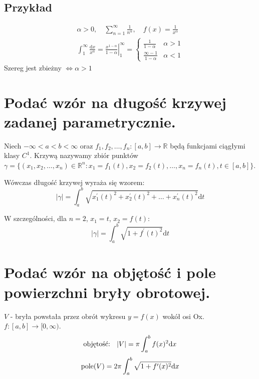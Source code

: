 \documentclass{article}
\theoremstyle{definition}
\theoremstyle{case}
\let\iff\Leftrightarrow
\begin{document}
						\subsection{Przykład}

						\begin{gather*}
							\alpha > 0 ,\quad \displaystyle\sum_{n=1}^\infty \frac{1}{n^\alpha} ,\quad f(x) = \frac{1}{x^\alpha}
							\\\int_1^\infty \frac{\mathrm{d}x}{x^\alpha}
							= \left. \frac{x^{1-\alpha}}{1-\alpha} \right|_1^\infty
							= \left\{
								\begin{array}{lr}
									\frac{1}{1-\alpha} & \alpha > 1
									\\\frac{\infty-1}{1-\alpha} & \alpha < 1
								\end{array}
								\right.
							\end{gather*}
							Szereg jest zbieżny $\iff \alpha > 1$


							\section{Podać wzór na długość krzywej zadanej parametrycznie.}
							Niech $-\infty < a < b < \infty$ oraz
							$f_1, f_2, \dots, f_n \colon [a,b] \to \mathbb{R}$ będą funkcjami ciągłymi klasy $C^1$.
							Krzywą nazywamy zbiór punktów
							${\gamma = \{ (x_1, x_2, \dots, x_n) \in \mathbb{R}^n \colon 
						x_1 = f_1 (t), x_2 = f_2 (t), \dots, x_n = f_n (t), t \in [a,b] \} }$.

						Wówczas długość krzywej wyraża się wzorem:
						\begin{equation*}
							| \gamma | = \int_a^b \sqrt{x_1^\prime(t)^2 + x_2^\prime(t)^2 + \dots + x_n^\prime(t)^2} \mathrm{d}t
						\end{equation*}

						W szczególności, dla $n=2$, $x_1=t$, $x_2=f(t)$:
						\begin{equation*}
							| \gamma | = \int_a^b \sqrt{1 + f ^\prime (t) ^2} \mathrm{d}t
						\end{equation*}

						\section{Podać wzór na objętość i pole powierzchni bryły obrotowej.}
						\begin{wrapfigure}{R}{20em+2em}
							\def\svgwidth{20em}
							
						\end{wrapfigure}
						$V$ - bryła powstała przez obrót wykresu $y=f(x)$ wokół osi Ox. $f \colon [a,b] \to [0,\infty)$.
							\begin{equation*}
								\textnormal{objętość: \enskip}
								| V | = \pi \int_a^b f(x)^2 \mathrm{d}x
							\end{equation*}
							\begin{equation*}
								\textnormal{pole} (V) = 2\pi \int_a^b \sqrt{1 + f^\prime(x)^2} \mathrm{d}x
							\end{equation*}

							
\end{document}
